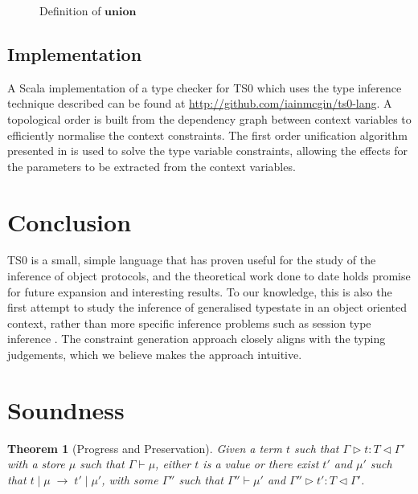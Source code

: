 \documentclass[preprint]{sigplanconf}
\newtheorem{thm}{Theorem}
\newcommand{\typerule}[4]{#1 \triangleright #2 : #3 \triangleleft #4}
\newcommand{\oprule}[4]{#1 \mid #2\;\longrightarrow\;#3 \mid #4}
\begin{document}
\begin{figure}

\caption{\label{fig:overlaydefn} Definition of $\mathbf{union}$}
\end{figure}


\subsection{Implementation}

A Scala implementation of a type checker for TS0 which uses the type inference
technique described can be found at \url{http://github.com/iainmcgin/ts0-lang}.
A topological order is built from the dependency graph between context variables
to efficiently normalise the context constraints. The first order unification 
algorithm presented in \cite{Martelli1982} is used to solve the type variable 
constraints, allowing the effects for the parameters to be extracted from
the context variables.

\section{Conclusion}

TS0 is a small, simple language that has proven useful
for the study of the inference of object protocols, and the theoretical work
done to date holds promise for future expansion and interesting results. 
To our knowledge, this is also the first attempt to study the inference
of generalised typestate in an object oriented context, rather than
more specific inference problems such as session type inference
\cite{Collingbourne2010}. The
constraint generation approach closely aligns with the typing judgements,
which we believe makes the approach intuitive.

\appendix

\section{Soundness}

\begin{thm}[Progress and Preservation]
Given a term $t$ such that $\typerule{\Gamma}{t}{T}{\Gamma'}$
with a store $\mu$ such that $\Gamma \vdash \mu$, either $t$ is a value or 
there exist $t'$ and $\mu'$ such that
$\oprule{t}{\mu}{t'}{\mu'}$, with some $\Gamma''$ such that
$\Gamma'' \vdash \mu'$ and $\typerule{\Gamma''}{t'}{T}{\Gamma'}$.
\end{thm}
\end{document}
